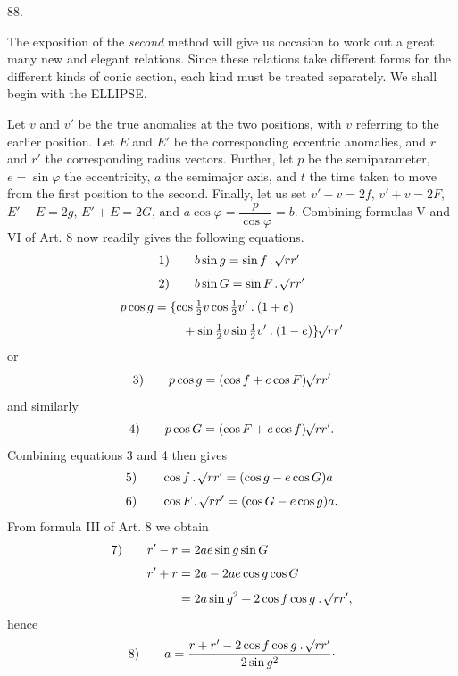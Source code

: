 \par{}\medskip
\hypertarget{native-118-article088}{}
\begin{center}88.\end{center}
The exposition of the \textit{second} method will give us occasion to work out a great many new and elegant relations. Since these relations take different forms for the different kinds of conic section, each kind must be treated separately. We shall begin with the ELLIPSE.

Let $v$ and $v'$ be the true anomalies at the two positions, with $v$ referring to the earlier position. Let $E$ and $E'$ be the corresponding eccentric anomalies, and $r$ and $r'$ the corresponding radius vectors. Further, let $p$ be the semiparameter, $e=\sin\varphi$ the eccentricity, $a$ the semimajor axis, and $t$ the time taken to move from the first position to the second. Finally, let us set $v'-v=2f$, $v'+v=2F$, $E'-E=2g$, $E'+E=2G$, and $a\cos\varphi=\dfrac{p}{\cos\varphi}=b$. Combining formulas V and VI of Art. 8 now readily gives the following equations.
\[
\begin{aligned}
\mathrm{1)}\qquad&b\sin g=\sin f\mathbin{.}\mathord{{}^{}\!\surd}rr'\\[4pt]
\mathrm{2)}\qquad&b\sin G=\sin F\mathbin{.}\mathord{{}^{}\!\surd}rr'
\end{aligned}
\]
\[
\begin{aligned}
p\cos g={}&\{\cos\tfrac12v\cos\tfrac12v'\mathbin{.}(1+e)\\[3pt]
&\quad+\sin\tfrac12v\sin\tfrac12v'\mathbin{.}(1-e)\}\mathord{{}^{}\!\surd}rr'
\end{aligned}
\]
or
\[
\mathrm{3)}\qquad p\cos g=(\cos f+e\cos F)\mathord{{}^{}\!\surd}rr'
\]
and similarly
\[
\mathrm{4)}\qquad p\cos G=(\cos F+e\cos f)\mathord{{}^{}\!\surd}rr'.
\]
Combining equations 3 and 4 then gives
\[
\begin{aligned}
\mathrm{5)}\qquad&\cos f\mathbin{.}\mathord{{}^{}\!\surd}rr'=(\cos g-e\cos G)a\\[4pt]
\mathrm{6)}\qquad&\cos F\mathbin{.}\mathord{{}^{}\!\surd}rr'=(\cos G-e\cos g)a.
\end{aligned}
\]
From formula III of Art. 8 we obtain
\[
\begin{aligned}
\mathrm{7)}\qquad r'-r&=2ae\sin g\sin G\\[4pt]
r'+r&=2a-2ae\cos g\cos G\\[4pt]
&=2a\sin g^2+2\cos f\cos g\mathbin{.}\mathord{{}^{}\!\surd}rr',
\end{aligned}
\]
hence
\[
\mathrm{8)}\qquad a=\frac{r+r'-2\cos f\cos g\mathbin{.}\mathord{{}^{}\!\surd}rr'}{2\sin g^2}\mathpunct{\cdot}
\]
